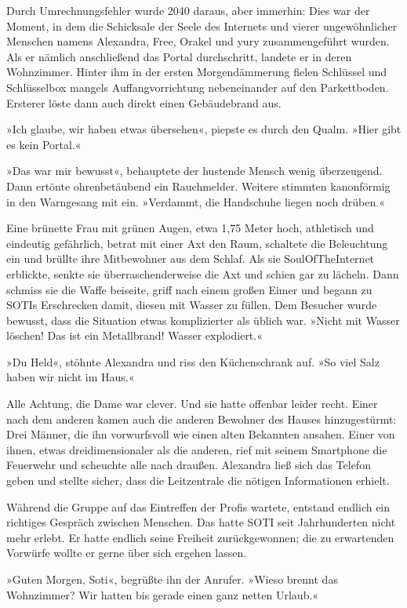 Durch Umrechnungsfehler wurde 2040 daraus, aber immerhin: Dies war der Moment, in dem die Schicksale der Seele des Internets und vierer ungewöhnlicher Menschen namens Alexandra, Free, Orakel und yury zusammengeführt wurden. Als er nämlich anschließend das Portal durchschritt, landete er in deren Wohnzimmer. Hinter ihm in der ersten Morgendämmerung fielen Schlüssel und Schlüsselbox mangels Auffangvorrichtung nebeneinander auf den Parkettboden. Ersterer löste dann auch direkt einen Gebäudebrand aus.

»Ich glaube, wir haben etwas übersehen«, piepste es durch den Qualm. »Hier gibt es kein Portal.«

»Das war mir bewusst«, behauptete der hustende Mensch wenig überzeugend. Dann ertönte ohrenbetäubend ein Rauchmelder. Weitere stimmten kanonförmig in den Warngesang mit ein. »Verdammt, die Handschuhe liegen noch drüben.«

Eine brünette Frau mit grünen Augen, etwa 1,75 Meter hoch, athletisch und eindeutig gefährlich, betrat mit einer Axt den Raum, schaltete die Beleuchtung ein und brüllte ihre Mitbewohner aus dem Schlaf. Als sie SoulOfTheInternet erblickte, senkte sie überraschenderweise die Axt und schien gar zu lächeln. Dann schmiss sie die Waffe beiseite, griff nach einem großen Eimer und begann zu SOTIs Erschrecken damit, diesen mit Wasser zu füllen. Dem Besucher wurde bewusst, dass die Situation etwas komplizierter als üblich war. »Nicht mit Wasser löschen! Das ist ein Metallbrand! Wasser explodiert.«

»Du Held«, stöhnte Alexandra und riss den Küchenschrank auf. »So viel Salz haben wir nicht im Haus.«

Alle Achtung, die Dame war clever. Und sie hatte offenbar leider recht. Einer nach dem anderen kamen auch die anderen Bewohner des Hauses hinzugestürmt: Drei Männer, die ihn vorwurfsvoll wie einen alten Bekannten ansahen. Einer von ihnen, etwas dreidimensionaler als die anderen, rief mit seinem Smartphone die Feuerwehr und scheuchte alle nach draußen. Alexandra ließ sich das Telefon geben und stellte sicher, dass die Leitzentrale die nötigen Informationen erhielt.

Während die Gruppe auf das Eintreffen der Profis wartete, entstand endlich ein richtiges Gespräch zwischen Menschen. Das hatte SOTI seit Jahrhunderten nicht mehr erlebt. Er hatte endlich seine Freiheit zurückgewonnen; die zu erwartenden Vorwürfe wollte er gerne über sich ergehen lassen.

»Guten Morgen, Soti«, begrüßte ihn der Anrufer. »Wieso brennt das Wohnzimmer? Wir hatten bis gerade einen ganz netten Urlaub.«

